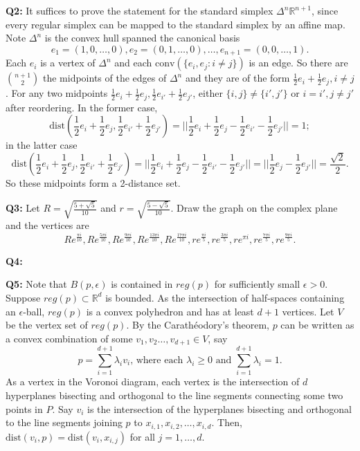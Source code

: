 \documentclass[12pt,reqno]{amsart}
\theoremstyle{definition}
\newcommand{\RR}{\mathbb{R}}
\newcommand{\conv}[1]{\mathrm{conv}(#1)}
\newcommand{\dist}[2]{\mathrm{dist}(#1, #2)}
\begin{document}
\newpage
\noindent \textbf{Q2:} It suffices to prove the statement for the standard simplex $\Delta^n \RR^{n+1}$, since every regular simplex can be mapped to the standard simplex by an affine map. Note $\Delta^n$ is the convex hull spanned the canonical basis $$e_1=(1,0,\dots,0), e_2=(0,1,\dots,0),\dots, e_{n+1} = (0,0,\dots,1).$$ Each $e_i$ is a vertex of $\Delta^n$ and each $\conv{\{e_i,e_j:i\not=j\}}$ is an edge. So there are $\binom{n+1}{2}$ the midpoints of the edges of $\Delta^n$ and they are of the form $\frac{1}{2}e_i+\frac{1}{2}e_j, i\not=j$. For any two midpoints $\frac{1}{2}e_i+\frac{1}{2}e_j, \frac{1}{2}e_{i'}+\frac{1}{2}e_{j'}$, either $\{i,j\}\not=\{i',j'\}$ or $i=i', j\not=j'$ after reordering. In the former case,  $$\mathrm{dist}( \frac{1}{2}e_i+\frac{1}{2}e_j, \frac{1}{2}e_{i'}+\frac{1}{2}e_{j'} ) = ||\frac{1}{2}e_i+\frac{1}{2}e_j - \frac{1}{2}e_{i'}-\frac{1}{2}e_{j'}||= 1;$$
in the latter case $$\mathrm{dist}( \frac{1}{2}e_i+\frac{1}{2}e_j, \frac{1}{2}e_{i'}+\frac{1}{2}e_{j'} ) = ||\frac{1}{2}e_i+\frac{1}{2}e_j - \frac{1}{2}e_{i'}-\frac{1}{2}e_{j'}|| =||\frac{1}{2}e_j -\frac{1}{2}e_{j'}||  = \frac{\sqrt{2}}{2}.$$
So these midpoints form a 2-distance set.



\newpage
\noindent \textbf{Q3:} Let $R=\sqrt{\frac{5+\sqrt{5}}{10}}$ and $r=\sqrt{\frac{5-\sqrt{5}}{10}}$. Draw the graph on the complex plane and the vertices are $$Re^{\frac{\pi i}{10}},Re^{\frac{5\pi i}{10}},Re^{\frac{9\pi i}{10}},Re^{\frac{13 \pi i}{10}},Re^{\frac{17\pi i}{10}}, re^{\frac{\pi i}{5}}, re^{\frac{3\pi i}{5}},  re^{\pi i},  re^{\frac{7\pi i}{5}}, re^{\frac{9\pi i}{5}}.$$
\begin{center}
\end{center}


\newpage
\noindent \textbf{Q4:}

\newpage
\noindent \textbf{Q5:}  Note that $B(p,\epsilon)$ is contained in $reg(p)$ for sufficiently small $\epsilon >0$. Suppose $reg(p)\subset \RR^d$ is bounded. As the intersection of half-spaces containing an $\epsilon$-ball, $reg(p)$ is a convex polyhedron and has at least $d+1$ vertices. Let $V$ be the vertex set of $reg(p)$. By the Carath{\'e}odory's theorem, $p$ can be written as a convex combination of some $v_1,v_2\dots,v_{d+1} \in V$, say $$ p= \sum_{i=1}^{d+1} \lambda_i v_i \mbox{, where each } \lambda_i \geq 0 \mbox{ and } \sum_{i=1}^{d+1}\lambda_i=1.$$ As a vertex in the Voronoi diagram, each vertex is the intersection of $d$ hyperplanes bisecting and orthogonal to the line segments connecting some two points in $P$. Say $v_i$ is the intersection of the hyperplanes bisecting and orthogonal to the line segments joining $p$ to $x_{i,1},x_{i,2},\dots,x_{i,d}$. Then, $\dist{v_i}{p}=\dist{v_i}{x_{i,j}}$ for all $j=1,\dots,d$.
\end{document}
